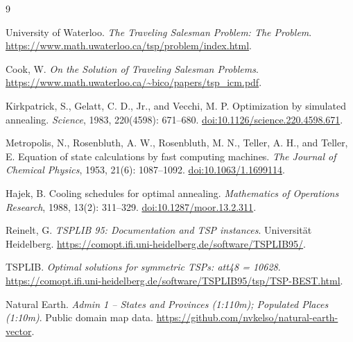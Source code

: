 \documentclass[UTF8,a4paper,11pt,fontset=none]{ctexart}
\numberwithin{equation}{section}
\begin{document}
\clearpage
\begin{thebibliography}{9}
  \small
  \raggedright
  \setlength{\itemsep}{4pt}
  University of Waterloo.
  \emph{The Traveling Salesman Problem: The Problem}.
  \url{https://www.math.uwaterloo.ca/tsp/problem/index.html}.

  Cook, W.
  \emph{On the Solution of Traveling Salesman Problems}.
  \url{https://www.math.uwaterloo.ca/~bico/papers/tsp_icm.pdf}.

  Kirkpatrick, S., Gelatt, C. D., Jr., and Vecchi, M. P.
  Optimization by simulated annealing.
  \emph{Science}, 1983, 220(4598): 671--680.
  \href{https://doi.org/10.1126/science.220.4598.671}{doi:10.1126/science.220.4598.671}.

  Metropolis, N., Rosenbluth, A. W., Rosenbluth, M. N., Teller, A. H., and Teller, E.
  Equation of state calculations by fast computing machines.
  \emph{The Journal of Chemical Physics}, 1953, 21(6): 1087--1092.
  \href{https://doi.org/10.1063/1.1699114}{doi:10.1063/1.1699114}.

  Hajek, B.
  Cooling schedules for optimal annealing.
  \emph{Mathematics of Operations Research}, 1988, 13(2): 311--329.
  \href{https://doi.org/10.1287/moor.13.2.311}{doi:10.1287/moor.13.2.311}.

  Reinelt, G. \emph{TSPLIB 95: Documentation and TSP instances}.
  Universität Heidelberg.
  \url{https://comopt.ifi.uni-heidelberg.de/software/TSPLIB95/}.

  TSPLIB. \emph{Optimal solutions for symmetric TSPs: att48 = 10628}.
  \url{https://comopt.ifi.uni-heidelberg.de/software/TSPLIB95/tsp/TSP-BEST.html}.

  Natural Earth. \emph{Admin 1 -- States and Provinces (1:110m);
  Populated Places (1:10m)}. Public domain map data.
  \url{https://github.com/nvkelso/natural-earth-vector}.
\end{thebibliography}
\end{document}
